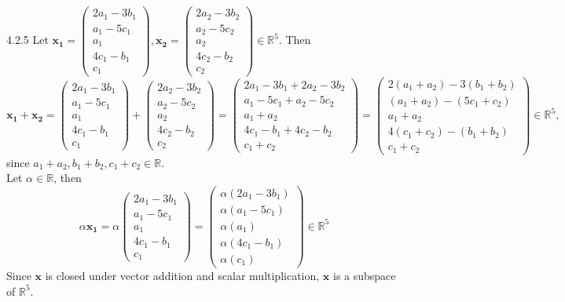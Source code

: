 \documentclass{article}
\theoremstyle{definition}
\begin{document}
\begin{prob}{4.2.5}
        Let $ \mathbf{x_1}= \begin{pmatrix} 2a_1-3b_1 \\ a_1-5c_1 \\ a_1 \\ 4c_1-b_1 \\ c_1 \end{pmatrix}, \mathbf{x_2} = \begin{pmatrix} 2a_2-3b_2 \\ a_2-5c_2 \\ a_2 \\ 4c_2-b_2 \\ c_2 \end{pmatrix} \in \mathbb{R}^5 $. Then
        \[
            \mathbf{x_1} + \mathbf{x_2} = \begin{pmatrix} 2a_1-3b_1 \\ a_1-5c_1 \\ a_1 \\ 4c_1-b_1 \\ c_1 \end{pmatrix} + \begin{pmatrix} 2a_2-3b_2 \\ a_2-5c_2 \\ a_2 \\ 4c_2-b_2 \\ c_2 \end{pmatrix}
            = \begin{pmatrix} 2a_1-3b_1 + 2a_2-3b_2 \\ a_1-5c_1 + a_2-5c_2 \\ a_1 + a_2 \\ 4c_1-b_1 + 4c_2-b_2 \\ c_1+c_2 \end{pmatrix}
            = \begin{pmatrix} 2(a_1+a_2)-3(b_1 + b_2) \\ (a_1+a_2)-(5c_1+c_2) \\ a_1 + a_2 \\ 4(c_1+c_2)-(b_1+b_2) \\ c_1+c_2 \end{pmatrix} \in \mathbb{R}^5,
        \]
        since $a_1+a_2, b_1+b_2, c_1+c_2 \in \mathbb{R}$.\\
        
        Let $\alpha \in \mathbb{R}$, then
        \[
            \alpha \mathbf{x_1} = \alpha \begin{pmatrix} 2a_1-3b_1 \\ a_1-5c_1 \\ a_1 \\ 4c_1-b_1 \\ c_1 \end{pmatrix} = \begin{pmatrix} \alpha(2a_1-3b_1) \\ \alpha(a_1-5c_1) \\ \alpha(a_1) \\ \alpha(4c_1-b_1) \\ \alpha(c_1) \end{pmatrix} \in \mathbb{R}^5
        \]
        Since $\mathbf{x}$ is closed under vector addition and scalar multiplication, $\mathbf{x}$ is a subspace of $\mathbb{R}^5$.\\
        

\end{prob}
\end{document}
